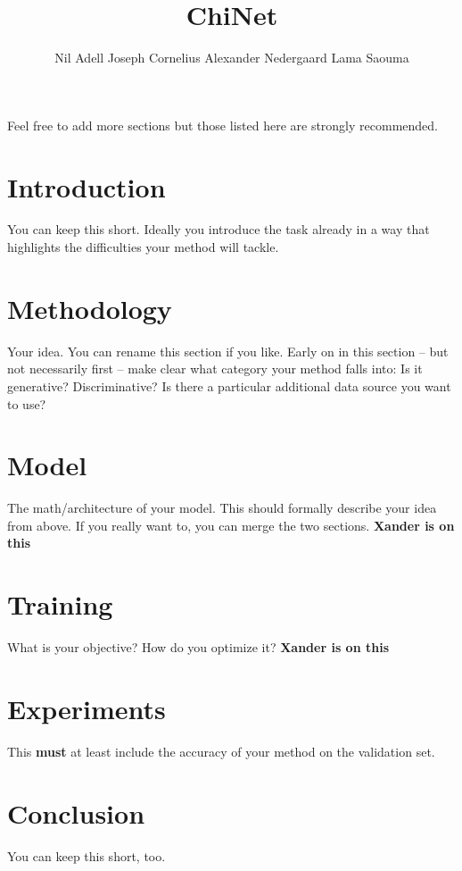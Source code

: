 \documentclass{article}
\title{ChiNet}
\author{Nil Adell \qquad Joseph Cornelius \qquad Alexander Nedergaard \qquad Lama Saouma}
\begin{document}

\maketitle


Feel free to add more sections but those listed here are strongly recommended.
\section{Introduction}
You can keep this short. Ideally you introduce the task already in a way that highlights the difficulties  your method will tackle.
\section{Methodology}
Your idea. You can rename this section if you like. Early on in this section -- but not necessarily first -- make clear what category your method falls into: Is it generative? Discriminative? Is there a particular additional data source you want to use?
\section{Model}
The math/architecture of your model. This should formally describe your idea from above. If you really want to, you can merge the two sections. \textbf{Xander is on this}
\section{Training}
What is your objective? How do you optimize it?
\textbf{Xander is on this}
\section{Experiments}
This {\bf must} at least include the accuracy of your method on the validation set.
\section{Conclusion}
You can keep this short, too.
\end{document}
